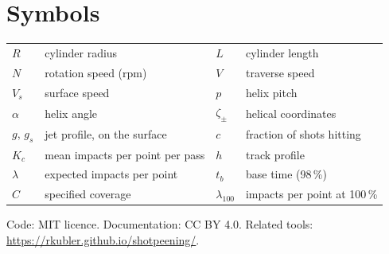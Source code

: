 \documentclass[11pt,a4paper]{article}
\begin{document}
\appendix
\section{Symbols}
\begin{tabular}{@{}ll@{\qquad}ll@{}}
$R$ & cylinder radius & $L$ & cylinder length\\
$N$ & rotation speed (rpm) & $V$ & traverse speed\\
$V_s$ & surface speed & $p$ & helix pitch\\
$\alpha$ & helix angle & $\zeta_\pm$ & helical coordinates\\
$g$, $g_s$ & jet profile, on the surface & $c$ & fraction of shots hitting\\
$K_c$ & mean impacts per point per pass & $h$ & track profile\\
$\lambda$ & expected impacts per point & $t_b$ & base time (98\,\%)\\
$C$ & specified coverage & $\lambda_{100}$ & impacts per point at 100\,\%\\
\end{tabular}

\vfill
\noindent\small Code: MIT licence. Documentation: CC BY 4.0. Related tools: \url{https://rkubler.github.io/shotpeening/}.
\end{document}
